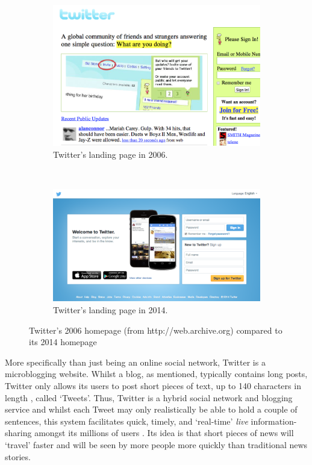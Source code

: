 \begin{figure}[h]
\begin{subfigure}{.9\textwidth}
    \centering
    \includegraphics[scale=0.4]{1.Introduction/Media/old_twitter.png} 
    \caption{Twitter's landing page in 2006.}
    \label{fig:old_twitter}
\end{subfigure}\\
\begin{subfigure}{.9\textwidth}
    \centering
    \includegraphics[scale=0.4]{1.Introduction/Media/new_twitter.png} 
    \caption{Twitter's landing page in 2014.}
    \label{fig:new_twitter}
\end{subfigure}
\caption{Twitter's 2006 homepage (from http://web.archive.org) compared to its 2014 homepage}
\label{fig:old_twitter-new_twitter}
\end{figure}


More specifically than just being an online social network, Twitter is a microblogging website. Whilst a blog, as mentioned, typically contains long posts, Twitter only allows its users to post short pieces of text, up to 140 characters in length \cite{krishnamurthy08, huberman08}, called `Tweets'. Thus, Twitter is a hybrid social network and blogging service and whilst each Tweet may only realistically be able to hold a couple of sentences, this system facilitates quick, timely, and `real-time' \textit{live} information-sharing amongst its millions of users \cite{zhao09}. Its idea is that short pieces of news will `travel' faster and will be seen by more people more quickly than traditional news stories.

